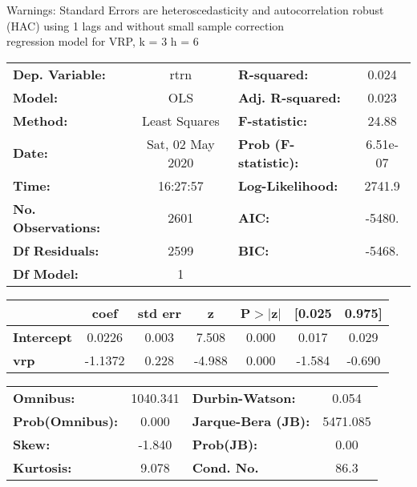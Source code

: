 Warnings: \newline
 [1] Standard Errors are heteroscedasticity and autocorrelation robust (HAC) using 1 lags and without small sample correction\\ 

regression model for VRP, k = 3 h = 6\begin{center}
\begin{tabular}{lclc}
\toprule
\textbf{Dep. Variable:}    &       rtrn       & \textbf{  R-squared:         } &     0.024   \\
\textbf{Model:}            &       OLS        & \textbf{  Adj. R-squared:    } &     0.023   \\
\textbf{Method:}           &  Least Squares   & \textbf{  F-statistic:       } &     24.88   \\
\textbf{Date:}             & Sat, 02 May 2020 & \textbf{  Prob (F-statistic):} &  6.51e-07   \\
\textbf{Time:}             &     16:27:57     & \textbf{  Log-Likelihood:    } &    2741.9   \\
\textbf{No. Observations:} &        2601      & \textbf{  AIC:               } &    -5480.   \\
\textbf{Df Residuals:}     &        2599      & \textbf{  BIC:               } &    -5468.   \\
\textbf{Df Model:}         &           1      & \textbf{                     } &             \\
\bottomrule
\end{tabular}
\begin{tabular}{lcccccc}
                   & \textbf{coef} & \textbf{std err} & \textbf{z} & \textbf{P$> |$z$|$} & \textbf{[0.025} & \textbf{0.975]}  \\
\midrule
\textbf{Intercept} &       0.0226  &        0.003     &     7.508  &         0.000        &        0.017    &        0.029     \\
\textbf{vrp}       &      -1.1372  &        0.228     &    -4.988  &         0.000        &       -1.584    &       -0.690     \\
\bottomrule
\end{tabular}
\begin{tabular}{lclc}
\textbf{Omnibus:}       & 1040.341 & \textbf{  Durbin-Watson:     } &    0.054  \\
\textbf{Prob(Omnibus):} &   0.000  & \textbf{  Jarque-Bera (JB):  } & 5471.085  \\
\textbf{Skew:}          &  -1.840  & \textbf{  Prob(JB):          } &     0.00  \\
\textbf{Kurtosis:}      &   9.078  & \textbf{  Cond. No.          } &     86.3  \\
\bottomrule
\end{tabular}
\end{center}

